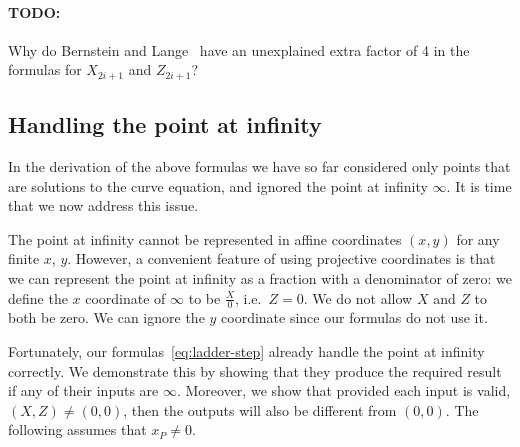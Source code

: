\documentclass{article}
\begin{document}
\paragraph{TODO:} Why do Bernstein and Lange~\cite[Theorem 4.4]{Bernstein:2017fm} have an unexplained extra factor of 4 in the formulas for $X_{2i+1}$ and $Z_{2i+1}$?

\subsection{Handling the point at infinity}

In the derivation of the above formulas we have so far considered only points that are solutions to the curve equation, and ignored the point at infinity $\infty$.
It is time that we now address this issue.

The point at infinity cannot be represented in affine coordinates $(x, y)$ for any finite $x$, $y$.
However, a convenient feature of using projective coordinates is that we can represent the point at infinity as a fraction with a denominator of zero: we define the $x$ coordinate of $\infty$ to be $\frac{X}{0}$, i.e.\ $Z = 0$.
We do not allow $X$ and $Z$ to both be zero.
We can ignore the $y$ coordinate since our formulas do not use it.

Fortunately, our formulas~\eqref{eq:ladder-step} already handle the point at infinity correctly.
We demonstrate this by showing that they produce the required result if any of their inputs are $\infty$.
Moreover, we show that provided each input is valid, $(X, Z) \ne (0, 0)$, then the outputs will also be different from $(0, 0)$.
The following assumes that $x_P \ne 0$.
\end{document}

